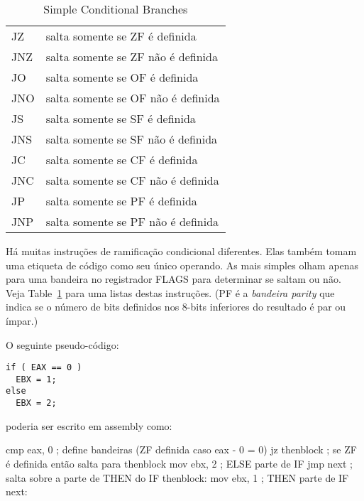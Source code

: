 \begin{table}[t]
\center
\begin{tabular}{|ll|}
\hline
JZ  & salta somente se ZF é definida \\
JNZ & salta somente se ZF não é definida \\
JO  & salta somente se OF é definida \\
JNO & salta somente se OF não é definida \\
JS  & salta somente se SF é definida \\
JNS & salta somente se SF não é definida \\
JC  & salta somente se CF é definida \\
JNC & salta somente se CF não é definida \\
JP  & salta somente se PF é definida \\
JNP & salta somente se PF não é definida \\
\hline
\end{tabular}
\caption{Simple Conditional Branches \label{tab:SimpBran}  
             
         }
\end{table}

Há muitas instruções de ramificação condicional diferentes. Elas também
tomam uma etiqueta de código como seu único operando. As mais simples olham apenas
para uma bandeira no registrador FLAGS para determinar se saltam ou
não. Veja Table~\ref{tab:SimpBran} para uma listas destas
instruções. (PF é a \emph{bandeira parity} 
que indica se o número de bits definidos nos 8-bits inferiores do resultado
é par ou ímpar.)

O seguinte pseudo-código:
\begin{Verbatim}
if ( EAX == 0 )
  EBX = 1;
else
  EBX = 2;
\end{Verbatim}
poderia ser escrito em assembly como:
\begin{AsmCodeListing}[frame=none]
      cmp    eax, 0            ; define bandeiras (ZF definida caso eax - 0 = 0)
      jz     thenblock         ; se ZF é definida então salta para thenblock
      mov    ebx, 2            ; ELSE parte de IF
      jmp    next              ; salta sobre a parte de THEN do IF
thenblock:
      mov    ebx, 1            ; THEN parte de IF
next:
\end{AsmCodeListing}

